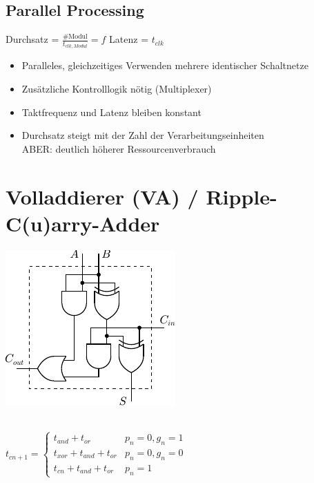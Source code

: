 \documentclass[6pt,a4paper]{scrartcl}
\begin{document}
\begin{multicols}{3}
\subsection{Parallel Processing} %

Durchsatz = $\frac{\#\text{Modul}}{t_{clk,Modul}} = f$ \qquad \quad Latenz = $t_{clk}$
\begin{itemize} \itemsep0pt
	\item Paralleles, gleichzeitiges Verwenden mehrere identischer Schaltnetze
	\item Zusätzliche Kontrolllogik nötig (Multiplexer)
	\item Taktfrequenz und Latenz bleiben konstant
	\item Durchsatz steigt mit der Zahl der Verarbeitungseinheiten \\
	ABER: deutlich höherer Ressourcenverbrauch
\end{itemize}

\section{Volladdierer (VA) / Ripple-C(u)arry-Adder}
\parbox{5.0cm}{ \includegraphics{img/ds/volladdierer.pdf} }
\\
$t_{cn+1} = \begin{cases} t_{and} + t_{or} & p_n = 0, g_n=1 \\ t_{xor} + t_{and} + t_{or} & p_n = 0, g_n = 0 \\ t_{cn} + t_{and} + t_{or} & p_n = 1 \end{cases}$\\





\end{multicols}
\end{document}
